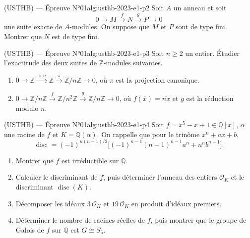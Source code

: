 \newpage

\begin{problem}{(USTHB) — Épreuve N°01}{alg:usthb-2023-e1-p2}
Soit $A$ un anneau et soit
$$
0\longrightarrow M\xrightarrow{\ f\ }N\xrightarrow{\ g\ }P\longrightarrow0
$$
une suite exacte de $A$-modules. On suppose que $M$ et $P$ sont de type fini.
Montrer que $N$ est de type fini.

\end{problem}

\newpage

\begin{problem}{(USTHB) — Épreuve N°01}{alg:usthb-2023-e1-p3}
Soit $n\ge2$ un entier. Étudier l'exactitude des deux suites de
$\mathbb{Z}$-modules suivantes.
\begin{enumerate}
\item[\textbf{(S1)}] $0\longrightarrow\mathbb{Z}\xrightarrow{\ \times n\ }\mathbb{Z}\xrightarrow{\ \pi\ }\mathbb{Z}/n\mathbb{Z}\longrightarrow0$,
      où $\pi$ est la projection canonique.
\item[\textbf{(S2)}] $0\longrightarrow\mathbb{Z}/n\mathbb{Z}\xrightarrow{\ f\ }\mathbb{Z}/n^2\mathbb{Z}\xrightarrow{\ g\ }\mathbb{Z}/n\mathbb{Z}\longrightarrow0$,
      où $f(\overline x)=\overline{nx}$ et $g$ est la réduction modulo $n$.
\end{enumerate}

\end{problem}

\newpage

\begin{problem}{(USTHB) — Épreuve N°01}{alg:usthb-2023-e1-p4}
Soit $f=x^5-x+1\in\mathbb{Q}[x]$, $\alpha$ une racine de $f$ et
$K=\mathbb{Q}(\alpha)$. On rappelle que pour le trinôme $x^n+ax+b$,
$$
\operatorname{disc}=(-1)^{n(n-1)/2}\big[(-1)^{n-1}(n-1)^{n-1}a^n+n^nb^{n-1}\big].
$$
\begin{enumerate}
\item Montrer que $f$ est irréductible sur $\mathbb{Q}$.
\item Calculer le discriminant de $f$, puis déterminer l'anneau des entiers
      $\mathcal{O}_K$ et le discriminant $\operatorname{disc}(K)$.
\item Décomposer les idéaux $3\,\mathcal{O}_K$ et $19\,\mathcal{O}_K$ en produit
      d'idéaux premiers.
\item Déterminer le nombre de racines réelles de $f$, puis montrer que le groupe de
      Galois de $f$ sur $\mathbb{Q}$ est $G\cong S_5$.
\end{enumerate}

\end{problem}

